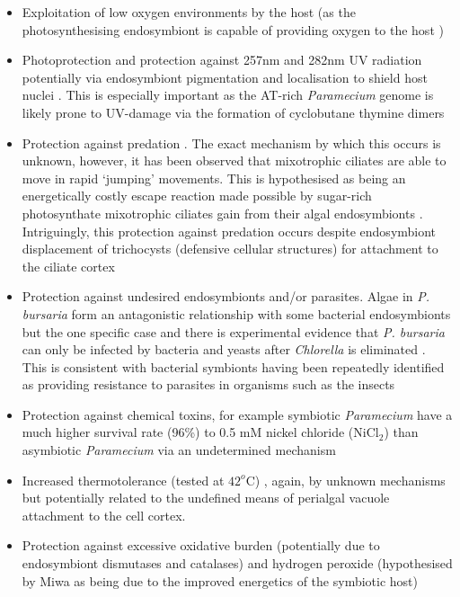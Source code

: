 \begin{itemize}
    \item Exploitation of low oxygen environments by the host (as the photosynthesising endosymbiont is capable of providing oxygen to the host \citep{Reisser1980})
\item Photoprotection and protection against 257nm and 282nm UV radiation potentially via endosymbiont pigmentation and localisation to shield host nuclei \citep{Sommaruga2009,Summerer2009,Miwa2009}.  
    This is especially important as the AT-rich \textit{Paramecium} genome is likely prone to UV-damage via the formation of cyclobutane thymine dimers \citep{Sommaruga2009}
\item Protection against predation \citep{Berger1980}. 
    The exact mechanism by which this occurs is unknown, however, it has been observed that mixotrophic ciliates are able to move in rapid `jumping' movements. 
    This is hypothesised as being an energetically costly escape reaction made possible by sugar-rich photosynthate mixotrophic ciliates gain from their algal endosymbionts \citep{Perez1997}. 
    Intriguingly, this protection against predation occurs despite endosymbiont displacement of trichocysts (defensive cellular structures) for attachment to the ciliate cortex \citep{Kodama2011}
    \item Protection against undesired endosymbionts and/or parasites. Algae in \textit{P. bursaria} form an antagonistic relationship with some 
        bacterial endosymbionts but the one specific case %
        and there is experimental evidence that \textit{P. bursaria} can only be infected by bacteria and yeasts after
\textit{Chlorella} is eliminated \citep{Gortz1982}. This is consistent with bacterial symbionts having been repeatedly identified as providing resistance to parasites in organisms
such as the insects \citep{Martinez2014}
\item Protection against chemical toxins, for example symbiotic \textit{Paramecium} have a much higher survival rate (96\%) to 0.5 mM nickel chloride (NiCl$_{2}$) than asymbiotic \textit{Paramecium} via an undetermined mechanism \citep{Miwa2009}
\item Increased thermotolerance (tested at $42^{o}$C) \citep{Miwa2009}, again, by unknown mechanisms but potentially related to the undefined means of perialgal vacuole attachment to the cell cortex.
\item Protection against excessive oxidative burden (potentially due to endosymbiont dismutases and catalases) \citep{Hortnagl2007a} and hydrogen peroxide (hypothesised by Miwa as being due to the improved energetics of the symbiotic host) \citep{Miwa2009}
\end{itemize}

